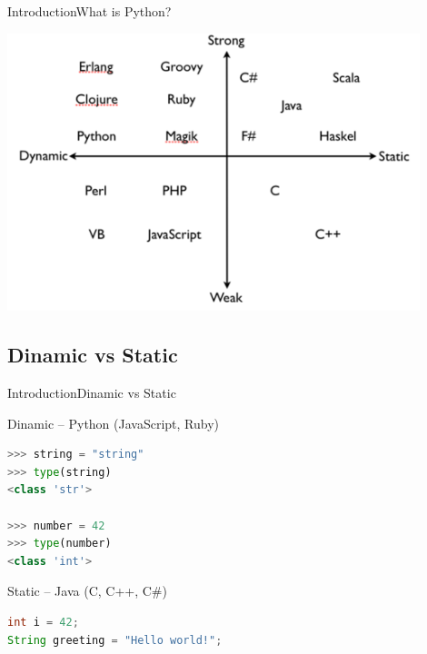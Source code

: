 \documentclass[10pt]{beamer}
\begin{document}
\begin{frame}{Introduction}{What is Python?}
	\begin{center}
		\includegraphics[width=0.9\textwidth]{pictures/1.png}
	\end{center}
\end{frame}



\subsection{Dinamic vs Static}

\begin{frame}[fragile]{Introduction}{Dinamic vs Static}
\begin{center}
\begin{block}{Dinamic -- Python (JavaScript, Ruby)}
			
\begin{lstlisting}[language=Python]
>>> string = "string"
>>> type(string)
<class 'str'>

>>> number = 42
>>> type(number)
<class 'int'>

\end{lstlisting}
\end{block}
		
\pause
		
\begin{block}{Static -- Java (C, C++, C\#)}
			
\begin{lstlisting}[language=Java]
int i = 42;
String greeting = "Hello world!";
\end{lstlisting}

\end{block}

\end{center}
\end{frame}
\end{document}

